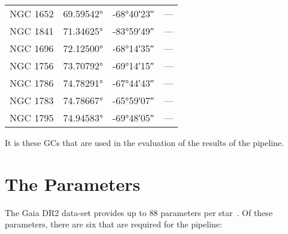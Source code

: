 \begin{table}[H]
\begin{tabular}[t]{l l l c}
        NGC 1652               & \ang[minimum-integer-digits=2]{69.59542}  & \ang[minimum-integer-digits=2]{-68;40;23}   & ---                   \\
        NGC 1841               & \ang[minimum-integer-digits=2]{71.34625}  & \ang[minimum-integer-digits=2]{-83;59;49}   & ---                   \\
        NGC 1696               & \ang[minimum-integer-digits=2]{72.12500}  & \ang[minimum-integer-digits=2]{-68;14;35}   & ---                   \\
        NGC 1756               & \ang[minimum-integer-digits=2]{73.70792}  & \ang[minimum-integer-digits=2]{-69;14;15}   & ---                   \\
        NGC 1786               & \ang[minimum-integer-digits=2]{74.78291}  & \ang[minimum-integer-digits=2]{-67;44;43}   & ---                   \\
        NGC 1783               & \ang[minimum-integer-digits=2]{74.78667}  & \ang[minimum-integer-digits=2]{-65;59;07}   & ---                   \\
        NGC 1795               & \ang[minimum-integer-digits=2]{74.94583}  & \ang[minimum-integer-digits=2]{-69;48;05}   & ---                   \\
        \midrule
        \bottomrule
    \end{tabular}
\end{table}
It is these GCs that are used in the evaluation of the results of the pipeline.

\newpage

\section{\label{sec:parameters}The Parameters}

The Gaia DR2 data-set provides up to 88 parameters per star~\cite{gaiaDr2}. Of
these parameters, there are six that are required for the pipeline:

